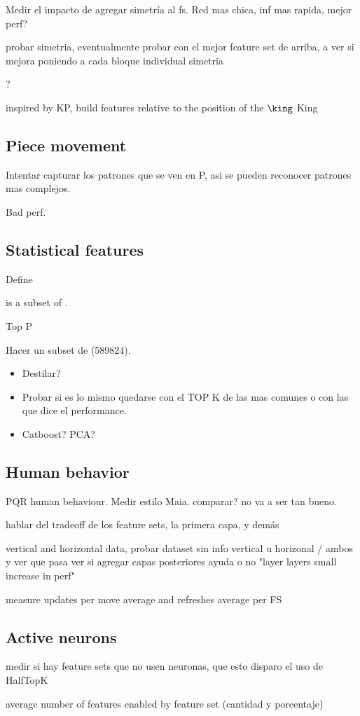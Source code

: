 Medir el impacto de agregar simetría al fs. Red mas chica, inf mas rapida, mejor perf?

probar simetria, eventualmente probar con el mejor feature set de arriba, a ver si mejora poniendo a cada bloque individual simetria

?

inspired by KP, build features relative to the position of the $\king$ King

\subsection{Piece movement}

Intentar capturar los patrones que se ven en P, asi se pueden reconocer patrones mas complejos.


Bad perf.

\subsection{Statistical features}

Define 

 is a subset of .

Top P

Hacer un subset de  (589824).

\begin{itemize}
\item Destilar?
\item Probar si es lo mismo quedarse con el TOP K de las mas comunes o con las que dice el performance.
\item Catboost? PCA?
\end{itemize}

\subsection{Human behavior}

PQR human behaviour. Medir estilo Maia. comparar? no va a ser tan bueno.




hablar del tradeoff de los feature sets, la primera capa, y demás

vertical and horizontal data, probar dataset sin info vertical u horizonal / ambos y ver que pasa
ver si agregar capas posteriores ayuda o no "layer layers small increase in perf"

measure updates per move average and refreshes average per FS



\subsection{Active neurons}

medir si hay feature sets que no usen neuronas, que esto disparo el uso de HalfTopK

average number of features enabled by feature set (cantidad y porcentaje)



